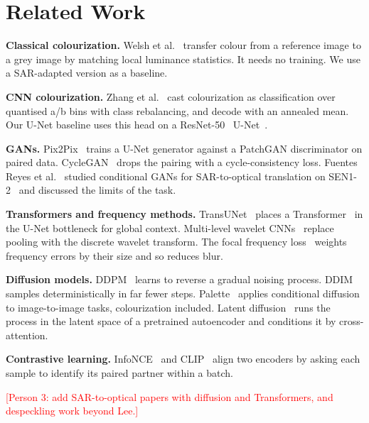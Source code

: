 \documentclass[conference]{IEEEtran}
\newcommand{\pend}[1]{\textcolor{red}{[#1]}}
\begin{document}
\section{Related Work}

\textbf{Classical colourization.} Welsh et al.~\cite{welsh2002transferring} transfer colour
from a reference image to a grey image by matching local luminance statistics. It needs no
training. We use a SAR-adapted version as a baseline.

\textbf{CNN colourization.} Zhang et al.~\cite{zhang2016colorful} cast colourization as
classification over quantised a/b bins with class rebalancing, and decode with an annealed
mean. Our U-Net baseline uses this head on a ResNet-50~\cite{he2016resnet}
U-Net~\cite{ronneberger2015unet}.

\textbf{GANs.} Pix2Pix~\cite{isola2017pix2pix} trains a U-Net generator against a PatchGAN
discriminator on paired data. CycleGAN~\cite{zhu2017cyclegan} drops the pairing with a
cycle-consistency loss. Fuentes Reyes et al.~\cite{fuentesreyes2019sar2opt} studied
conditional GANs for SAR-to-optical translation on SEN1-2~\cite{schmitt2018sen12} and
discussed the limits of the task.

\textbf{Transformers and frequency methods.} TransUNet~\cite{chen2021transunet} places a
Transformer~\cite{vaswani2017attention} in the U-Net bottleneck for global context.
Multi-level wavelet CNNs~\cite{liu2018mwcnn} replace pooling with the discrete wavelet
transform. The focal frequency loss~\cite{jiang2021ffl} weights frequency errors by their size
and so reduces blur.

\textbf{Diffusion models.} DDPM~\cite{ho2020ddpm} learns to reverse a gradual noising process.
DDIM~\cite{song2021ddim} samples deterministically in far fewer steps.
Palette~\cite{saharia2022palette} applies conditional diffusion to image-to-image tasks,
colourization included. Latent diffusion~\cite{rombach2022ldm} runs the process in the
latent space of a pretrained autoencoder and conditions it by cross-attention.

\textbf{Contrastive learning.} InfoNCE~\cite{oord2018cpc} and CLIP~\cite{radford2021clip}
align two encoders by asking each sample to identify its paired partner within a batch.

\pend{Person 3: add SAR-to-optical papers with diffusion and Transformers, and despeckling
work beyond Lee.}
\end{document}
